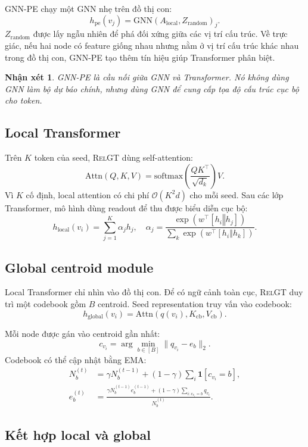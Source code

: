 \documentclass[12pt,a4paper]{article}
\newtheorem{remark}{Nhận xét}[section]
\newcommand{\RelGT}{\textsc{RelGT}}
\newcommand{\concat}{\mathbin{\Vert}}
\begin{document}
GNN-PE chạy một GNN nhẹ trên đồ thị con:
\[
  h_\text{pe}(v_j)=\text{GNN}(A_\text{local},Z_\text{random})_j.
\]
$Z_\text{random}$ được lấy ngẫu nhiên để phá đối xứng giữa các vị trí cấu trúc.
Về trực giác, nếu hai node có feature giống nhau nhưng nằm ở vị trí cấu trúc
khác nhau trong đồ thị con, GNN-PE tạo thêm tín hiệu giúp Transformer phân biệt.

\begin{remark}
GNN-PE là cầu nối giữa GNN và Transformer. Nó không dùng GNN làm bộ dự báo
chính, nhưng dùng GNN để cung cấp tọa độ cấu trúc cục bộ cho token.
\end{remark}

\subsection{Local Transformer}

Trên $K$ token của seed, \RelGT{} dùng self-attention:
\[
  \text{Attn}(Q,K,V)=
  \text{softmax}\left(\frac{QK^\top}{\sqrt{d_k}}\right)V.
\]
Vì $K$ cố định, local attention có chi phí $\mathcal{O}(K^2d)$ cho mỗi seed.
Sau các lớp Transformer, mô hình dùng readout để thu được biểu diễn cục bộ:
\[
  h_\text{local}(v_i)=
  \sum_{j=1}^{K}\alpha_j h_j,\quad
  \alpha_j=\frac{\exp(w^\top[h_i\concat h_j])}
  {\sum_k\exp(w^\top[h_i\concat h_k])}.
\]

\subsection{Global centroid module}

Local Transformer chỉ nhìn vào đồ thị con. Để có ngữ cảnh toàn cục, \RelGT{}
duy trì một codebook gồm $B$ centroid. Seed representation truy vấn vào
codebook:
\[
  h_\text{global}(v_i)=
  \text{Attn}(q(v_i),K_\text{cb},V_\text{cb}).
\]

Mỗi node được gán vào centroid gần nhất:
\[
  c_{v_i}=\arg\min_{b\in[B]}\|q_{v_i}-e_b\|_2.
\]
Codebook có thể cập nhật bằng EMA:
\begin{align}
  N_b^{(t)} &=
  \gamma N_b^{(t-1)}+(1-\gamma)\sum_i\mathbf{1}[c_{v_i}=b],\\
  e_b^{(t)} &=
  \frac{\gamma N_b^{(t-1)}e_b^{(t-1)}
  +(1-\gamma)\sum_{i:c_{v_i}=b}q_{v_i}}{N_b^{(t)}}.
\end{align}

\subsection{Kết hợp local và global}
\end{document}
